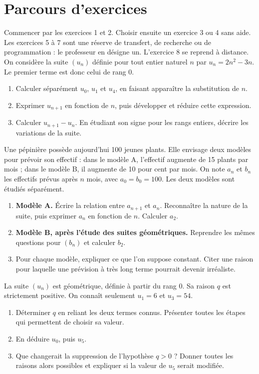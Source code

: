 \section*{Parcours d’exercices}\label{C01-PARC}
Commencer par les exercices 1 et 2. Choisir ensuite un exercice 3 ou 4 sans aide. Les exercices 5 à 7 sont une réserve de transfert, de recherche ou de programmation : le professeur en désigne un. L’exercice 8 se reprend à distance.
\begingroup
{}
On considère la suite $(u_n)$ définie pour tout entier naturel $n$ par $u_n=2n^2-3n$. Le premier terme est donc celui de rang 0.
\begin{enumerate}[label=\arabic*.]
\item Calculer séparément $u_0$, $u_1$ et $u_4$, en faisant apparaître la substitution de $n$.
\item Exprimer $u_{n+1}$ en fonction de $n$, puis développer et réduire cette expression.
\item Calculer $u_{n+1}-u_n$. En étudiant son signe pour les rangs entiers, décrire les variations de la suite.
\end{enumerate}
Une pépinière possède aujourd’hui 100 jeunes plants. Elle envisage deux modèles pour prévoir son effectif : dans le modèle A, l’effectif augmente de 15 plants par mois ; dans le modèle B, il augmente de 10 pour cent par mois. On note $a_n$ et $b_n$ les effectifs prévus après $n$ mois, avec $a_0=b_0=100$. Les deux modèles sont étudiés séparément.
\begin{enumerate}[label=\arabic*.]
\item \textbf{Modèle A.} Écrire la relation entre $a_{n+1}$ et $a_n$. Reconnaître la nature de la suite, puis exprimer $a_n$ en fonction de $n$. Calculer $a_2$.
\item \textbf{Modèle B, après l’étude des suites géométriques.} Reprendre les mêmes questions pour $(b_n)$ et calculer $b_2$.
\item Pour chaque modèle, expliquer ce que l’on suppose constant. Citer une raison pour laquelle une prévision à très long terme pourrait devenir irréaliste.
\end{enumerate}
La suite $(u_n)$ est géométrique, définie à partir du rang 0. Sa raison $q$ est strictement positive. On connaît seulement $u_1=6$ et $u_3=54$.
\begin{enumerate}[label=\arabic*.]
\item Déterminer $q$ en reliant les deux termes connus. Présenter toutes les étapes qui permettent de choisir sa valeur.
\item En déduire $u_0$, puis $u_5$.
\item Que changerait la suppression de l’hypothèse $q>0$ ? Donner toutes les raisons alors possibles et expliquer si la valeur de $u_5$ serait modifiée.
\end{enumerate}
